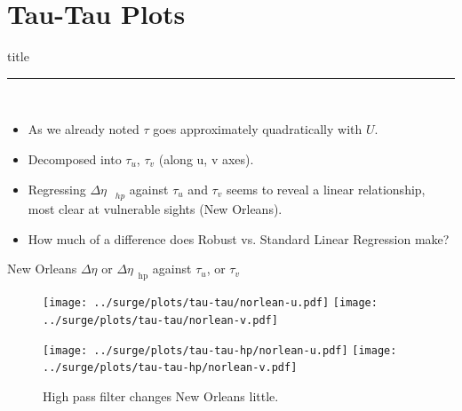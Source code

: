 \documentclass[usenames, dvipsnames]{beamer}
\begin{document}
\section{Tau-Tau Plots}
    \begin{frame}[plain]
        \vfill
      \centering
      \begin{beamercolorbox}[sep=8pt,center,shadow=true,rounded=true]{title}
        \insertsectionhead\par%
        \color{oxfordblue}\noindent\rule{10cm}{1pt} \\
        \begin{itemize}
        \item As we already noted $\tau$ goes approximately quadratically with $U$.
        \item Decomposed into $\tau_u$, $\tau_v$ (along u, v axes).
        \item Regressing $\Delta\eta_{\quad hp}$ against $\tau_u$ and $\tau_v$ seems to
         reveal a linear relationship, most clear at vulnerable sights (New Orleans).
        \item How much of a difference does Robust vs. Standard Linear Regression make?
        \end{itemize}
      \end{beamercolorbox}
      \vfill
  \end{frame}

\begin{frame}{New Orleans $\Delta\eta$ or $\Delta\eta_{\;\;\mathrm{hp}}$ against $\tau_u$, or $\tau_v$}
\vspace{-30pt}
\hspace{-30pt}
 \begin{minipage}{1.15\textwidth}
\begin{figure}[htb!]
    \centering
   \hspace{-40pt} \texttt{[image: ../surge/plots/tau-tau/norlean-u.pdf]}
        \texttt{[image: ../surge/plots/tau-tau/norlean-v.pdf]}

   \hspace{-40pt} \texttt{[image: ../surge/plots/tau-tau-hp/norlean-u.pdf]}
        \texttt{[image: ../surge/plots/tau-tau-hp/norlean-v.pdf]}
    \vspace{-15pt}
    \caption{High pass filter changes New Orleans little.}
    \label{fig:A}
\end{figure}
\end{minipage}
\end{frame}
\end{document}
